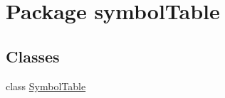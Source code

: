 \hypertarget{namespacesymbolTable}{}\section{Package symbol\+Table}
\label{namespacesymbolTable}
\subsection*{Classes}
\begin{DoxyCompactItemize}
\item 
class \hyperlink{classsymbolTable_1_1SymbolTable}{Symbol\+Table}
\end{DoxyCompactItemize}
